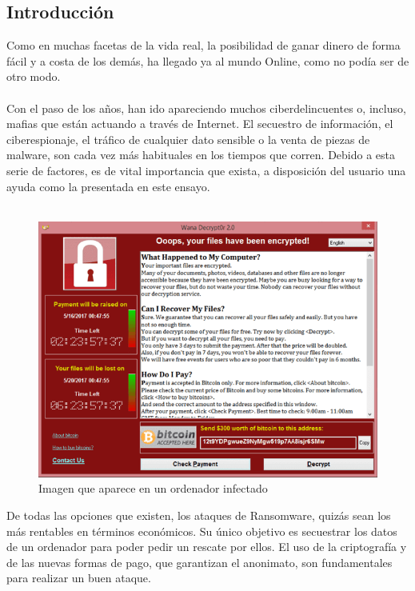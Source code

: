 \documentclass[a4paper,12pt]{article}
\begin{document}
\subsection{Introducción}
Como en muchas facetas de la vida real, la posibilidad de ganar dinero de forma fácil y a costa de los demás, ha llegado ya al mundo Online, como no podía ser de otro modo.\\\\
Con el paso de los años, han ido apareciendo muchos ciberdelincuentes o, incluso, mafias que están actuando a través de Internet. El secuestro de información, el ciberespionaje, el tráfico de cualquier dato sensible o la venta de piezas de malware, son cada vez más habituales en los tiempos que corren. Debido a esta serie de factores, es de vital importancia que exista, a disposición del usuario una ayuda como la presentada en este ensayo.\\\\
\begin{figure}[H]
	\centering
	\includegraphics[scale=0.7]{imagenes/screenshot.png}
	\caption[Imagen que aparece en un ordenador infectado]{Imagen que aparece en un ordenador infectado}
\end{figure}
De todas las opciones que existen, los ataques de Ransomware, quizás sean los más rentables en términos económicos. Su único objetivo es secuestrar los datos de un ordenador para poder pedir un rescate por ellos. El uso de la criptografía y de las nuevas formas de pago, que garantizan el anonimato, son fundamentales para realizar un buen ataque. 
\end{document}
